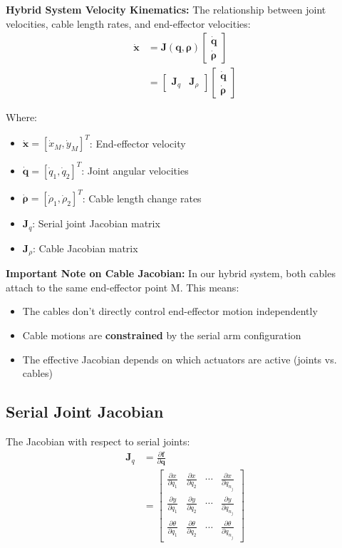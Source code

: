 \documentclass[11pt,a4paper]{article}
\begin{document}
\textbf{Hybrid System Velocity Kinematics:}
The relationship between joint velocities, cable length rates, and end-effector velocities:
\begin{align}
\dot{\bm{x}} &= \bm{J}(\bm{q}, \bm{\rho}) \begin{bmatrix} \dot{\bm{q}} \\ \dot{\bm{\rho}} \end{bmatrix} \\
&= \begin{bmatrix} \bm{J}_q & \bm{J}_{\rho} \end{bmatrix} \begin{bmatrix} \dot{\bm{q}} \\ \dot{\bm{\rho}} \end{bmatrix}
\end{align}

Where:
\begin{itemize}
    \item $\dot{\bm{x}} = [\dot{x}_M, \dot{y}_M]^T$: End-effector velocity
    \item $\dot{\bm{q}} = [\dot{q}_1, \dot{q}_2]^T$: Joint angular velocities
    \item $\dot{\bm{\rho}} = [\dot{\rho}_1, \dot{\rho}_2]^T$: Cable length change rates
    \item $\bm{J}_q$: Serial joint Jacobian matrix
    \item $\bm{J}_{\rho}$: Cable Jacobian matrix
\end{itemize}

\textbf{Important Note on Cable Jacobian:}
In our hybrid system, both cables attach to the same end-effector point M. This means:
\begin{itemize}
    \item The cables don't directly control end-effector motion independently
    \item Cable motions are \textbf{constrained} by the serial arm configuration
    \item The effective Jacobian depends on which actuators are active (joints vs. cables)
\end{itemize}

\subsection{Serial Joint Jacobian}
The Jacobian with respect to serial joints:
\begin{align}
\bm{J}_q &= \frac{\partial \bm{f}}{\partial \bm{q}} \\
&= \begin{bmatrix}
\frac{\partial x}{\partial q_1} & \frac{\partial x}{\partial q_2} & \cdots & \frac{\partial x}{\partial q_{n_j}} \\
\frac{\partial y}{\partial q_1} & \frac{\partial y}{\partial q_2} & \cdots & \frac{\partial y}{\partial q_{n_j}} \\
\frac{\partial \theta}{\partial q_1} & \frac{\partial \theta}{\partial q_2} & \cdots & \frac{\partial \theta}{\partial q_{n_j}}
\end{bmatrix}
\end{align}
\end{document}
